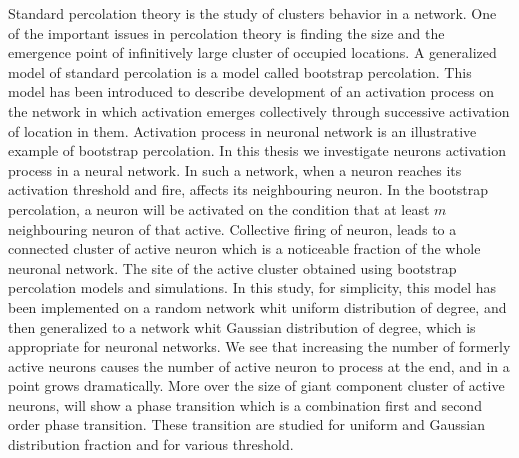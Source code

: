 \noindent 
Standard percolation theory is the study of clusters behavior in a network. One of the important issues in  percolation theory is finding the size and the emergence point of infinitively large cluster of occupied locations. A generalized model of standard percolation is a model called bootstrap percolation. This model has been introduced to describe development of an activation process on the network in which activation emerges collectively through successive activation of location in them. Activation process in neuronal network is an illustrative example of bootstrap percolation. In this thesis we investigate neurons activation process in a neural network. In such a network, when a neuron reaches its activation threshold and fire, affects its neighbouring neuron. In the bootstrap percolation, a neuron will be activated on the condition that at least $m$ neighbouring neuron of that active. Collective firing of neuron, leads to a connected cluster of active neuron which is a noticeable fraction of the whole neuronal network. The site of the active cluster obtained using bootstrap percolation models and simulations. In this study, for simplicity, this model has been implemented on a random network whit  
 uniform distribution of degree, and then generalized to a network whit Gaussian distribution of degree, which is appropriate for neuronal networks. We see that increasing the number of formerly active neurons causes the number of active neuron to process at the end, and in a point grows dramatically. More over the size of giant component cluster of active neurons, will show a phase transition which is a combination first and second order phase transition. These transition are studied for uniform and Gaussian distribution fraction and for various threshold.
 
